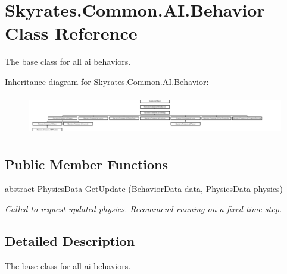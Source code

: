 \hypertarget{class_skyrates_1_1_common_1_1_a_i_1_1_behavior}{\section{Skyrates.\-Common.\-A\-I.\-Behavior Class Reference}
\label{class_skyrates_1_1_common_1_1_a_i_1_1_behavior}
}


The base class for all ai behaviors.  


Inheritance diagram for Skyrates.\-Common.\-A\-I.\-Behavior\-:\begin{figure}[H]
\begin{center}
\leavevmode
\includegraphics[height=1.750000cm]{class_skyrates_1_1_common_1_1_a_i_1_1_behavior}
\end{center}
\end{figure}
\subsection*{Public Member Functions}
\begin{DoxyCompactItemize}
\item 
abstract \hyperlink{class_skyrates_1_1_common_1_1_a_i_1_1_physics_data}{Physics\-Data} \hyperlink{class_skyrates_1_1_common_1_1_a_i_1_1_behavior_ae905e75f0456dececef5a5bccea7bcf7}{Get\-Update} (\hyperlink{class_skyrates_1_1_common_1_1_a_i_1_1_behavior_data}{Behavior\-Data} data, \hyperlink{class_skyrates_1_1_common_1_1_a_i_1_1_physics_data}{Physics\-Data} physics)
\begin{DoxyCompactList}\small\item\em Called to request updated physics. Recommend running on a fixed time step. \end{DoxyCompactList}\end{DoxyCompactItemize}


\subsection{Detailed Description}
The base class for all ai behaviors. 



